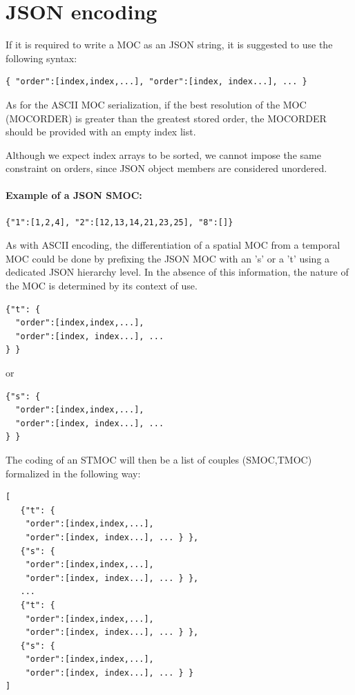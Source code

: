 \section{JSON encoding}
If it is required to write a MOC as an JSON string,
it is suggested to use the following syntax:

\par\noindent
\begin{lstlisting}[]
   { "order":[index,index,...], "order":[index, index...], ... }
\end{lstlisting}

As for the ASCII MOC serialization, if the best resolution
of the MOC (MOCORDER) is greater than the greatest stored order, the
MOCORDER should be provided with an empty index list.

Although we expect index arrays to be sorted, we cannot impose
the same constraint on orders, since JSON object members are considered unordered.

\paragraph{Example of a JSON SMOC:}
\par\noindent
\begin{lstlisting}[]
    {"1":[1,2,4], "2":[12,13,14,21,23,25], "8":[]}
\end{lstlisting}

As with ASCII encoding, the differentiation of a spatial MOC from a temporal MOC could be done by prefixing the JSON MOC with an 's' or a 't' using a dedicated JSON hierarchy level. In the absence of this information, the nature of the MOC is determined by its context of use.

\begin{lstlisting}[]
{"t": {
  "order":[index,index,...],
  "order":[index, index...], ...
} }
\end{lstlisting}

or

\begin{lstlisting}[]
{"s": {
  "order":[index,index,...],
  "order":[index, index...], ...
} }
\end{lstlisting}


The coding of an STMOC will then be a list of couples (SMOC,TMOC) formalized in the following way:

\begin{lstlisting}[]
[
   {"t": {
    "order":[index,index,...],
    "order":[index, index...], ... } },
   {"s": {
    "order":[index,index,...],
    "order":[index, index...], ... } },
   ...
   {"t": {
    "order":[index,index,...],
    "order":[index, index...], ... } },
   {"s": {
    "order":[index,index,...],
    "order":[index, index...], ... } }
]
\end{lstlisting}

